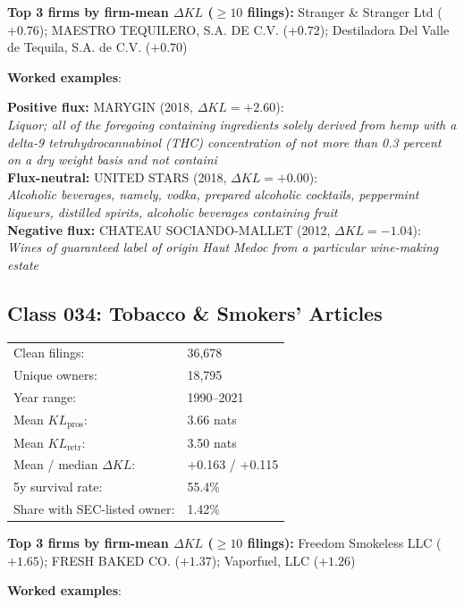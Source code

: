 \textbf{Top 3 firms by firm-mean $\Delta KL$ ($\geq 10$ filings):} Stranger \& Stranger Ltd ($+0.76$); MAESTRO TEQUILERO, S.A. DE C.V. ($+0.72$); Destiladora Del Valle de Tequila, S.A. de C.V. ($+0.70$)

\textbf{Worked examples}:

  \textbf{Positive flux:} \textsc{MARYGIN} (2018, $\Delta KL=+2.60$):\\
  \textit{Liquor; all of the foregoing containing ingredients solely derived from hemp with a delta-9 tetrahydrocannabinol (THC) concentration of not more than 0.3 percent on a dry weight basis and not containi}\\
  \textbf{Flux-neutral:} \textsc{UNITED STARS} (2018, $\Delta KL=+0.00$):\\
  \textit{Alcoholic beverages, namely, vodka, prepared alcoholic cocktails, peppermint liqueurs, distilled spirits, alcoholic beverages containing fruit}\\
  \textbf{Negative flux:} \textsc{CHATEAU SOCIANDO-MALLET} (2012, $\Delta KL=-1.04$):\\
  \textit{Wines of guaranteed label of origin Haut Medoc from a particular wine-making estate}\\

\subsection*{Class 034: Tobacco \& Smokers' Articles}
\label{app:industry-034}

\begin{tabular}{ll}
Clean filings: & 36,678 \\
Unique owners: & 18,795 \\
Year range: & 1990--2021 \\
Mean $KL_\text{pros}$: & 3.66 nats \\
Mean $KL_\text{retr}$: & 3.50 nats \\
Mean / median $\Delta KL$: & +0.163 / +0.115 \\
5y survival rate: & 55.4\% \\
Share with SEC-listed owner: & 1.42\% \\
\end{tabular}

\textbf{Top 3 firms by firm-mean $\Delta KL$ ($\geq 10$ filings):} Freedom Smokeless LLC ($+1.65$); FRESH BAKED CO. ($+1.37$); Vaporfuel, LLC ($+1.26$)

\textbf{Worked examples}:

